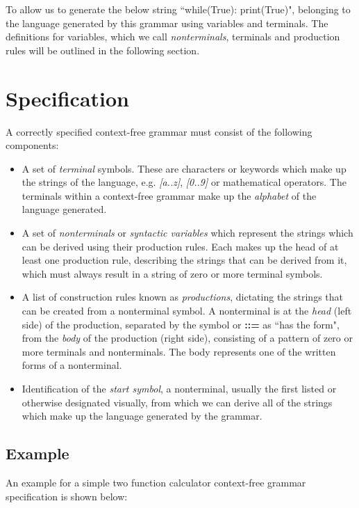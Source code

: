 \documentclass[a4paper, 11pt]{article}
\begin{document}
To allow us to generate the below string ``while(True): print(True)", belonging to the language generated by this grammar using variables and terminals. The definitions for variables, which we call \textit{nonterminals}, terminals and production rules will be outlined in the following section.

\newpage
\section{Specification}
A correctly specified context-free grammar must consist of the following components:

\begin{itemize}
	\item A set of \textit{terminal} symbols. These are characters or keywords which make up the strings of the language, e.g. \textit{[a..z]}, \textit{[0..9]} or mathematical operators. The terminals within a context-free grammar make up the \textit{alphabet} of the language generated.

	\item A set of \textit{nonterminals} or \textit{syntactic variables} which represent the strings which can be derived using their production rules. Each makes up the head of at least one production rule, describing the strings that can be derived from it, which must always result in a string of zero or more terminal symbols.

	\item A list of construction rules known as \textit{productions}, dictating the strings that can be created from a nonterminal symbol. A nonterminal is at the \textit{head} (left side) of the production, separated by the symbol \textbf{\textrightarrow} or \textbf{::=} as ``has the form", from the \textit{body} of the production (right side), consisting of a pattern of zero or more terminals and nonterminals. The body represents one of the written forms of a nonterminal.

	\item Identification of the \textit{start symbol}, a nonterminal, usually the first listed or otherwise designated visually, from which we can derive all of the strings which make up the language generated by the grammar.
\end{itemize}

\subsection{Example}
An example for a simple two function calculator context-free grammar specification is shown below:
\end{document}
